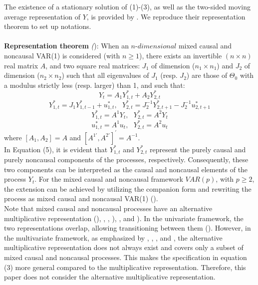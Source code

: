 \documentclass[<1p>]{elsarticle} %
\begin{document}
\indent The existence of a stationary solution of (1)-(3), as well as the two-sided moving average representation of $Y$, is provided by \cite{gourieroux2017noncausal}. We reproduce their representation theorem to set up notations.\\\\


\textbf{Representation theorem} \textit{(\cite{gourieroux2017noncausal}}): When an $n$-$dimensional$ mixed causal and noncausal VAR(1) is considered (with $n \geq 1$), there exists an invertible $(n\times n)$ real matrix $A$, and two square real matrices: $J_{1}$ of dimension ($n_{1}\times n_{1}$) and $J_{2}$ of 
dimension ($n_{2}\times n_{2}$) such that all eigenvalues of $J_{1}$ (resp. $J_{2}$) are those of $\Theta_0$ with a modulus strictly less (resp. larger) than 1, and such that:
\begin{equation}
	Y_{t} =  A_{1}Y_{1,t}^{*}+ A_{2} Y_{2,t}^{*}
\end{equation}
\begin{equation}
	Y_{1,t}^{*} =  J_{1}Y_{1,t-1}^{*}+ u_{1,t}^{*}, \ \ \       Y_{2,t}^{*} =  J_{2}^{-1}Y_{2,t+1}^{*}-J_{2}^{-1} u_{2,t+1}^{*}
\end{equation}
\begin{equation}
	Y_{1,t}^{*} =  A^{1}Y_{t}, \ \ \ Y_{2,t}^{*} =  A^{2}Y_{t}
\end{equation}
 \begin{equation}
	u_{1,t}^{*} =  A^{1}u_{t}, \ \ \ Y_{2,t}^{*} =  A^{2}u_{t}
\end{equation}
where $[A_{1},A_{2}]=A$ and $[A^{1\prime},A^{2\prime}]^{\prime}=A^{-1}$. \\


\indent In Equation (5), it is evident that $Y_{1,t}^*$ and $Y_{2,t}^*$ represent the purely causal and purely noncausal components of the processes, respectively. Consequently, these two components can be interpreted as the causal and noncausal elements of the process 
$Y_t$. For the mixed causal and noncausal framework $VAR(p)$, with $p \geq 2$, the extension can be achieved by utilizing the companion form and rewriting the process as mixed causal and noncausal VAR(1) (\cite{gourieroux2017noncausal}).\\


\indent Note that mixed causal and noncausal processes have an alternative multiplicative representation (\cite{lanne2011noncausal}), \cite{hecq2016identification}, \cite{gourieroux2016filtering}, \cite{lanne2013noncausal}), \cite{nyberg2014forecasting}, and \cite{cubadda2023detecting}). In the univariate framework, the two representations overlap, allowing transitioning between them (\cite{hecq2022spectral}). However, in the multivariate framework, as emphasized by \cite{davis2020noncausal}, \cite{rygh2022causal}, \cite{cubadda2023detecting}, and \cite{gourieroux2022nonlinear}, the alternative multiplicative representation does not always exist and covers only a subset of mixed causal and noncausal processes. This makes the specification in equation (3) more general compared to the multiplicative representation. Therefore, this paper does not consider the alternative multiplicative representation.
\end{document}
